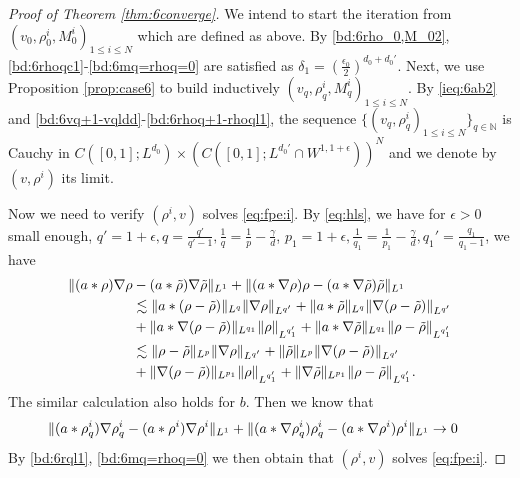 \documentclass[UTF-8,reqno]{amsart}
\numberwithin{equation}{section}
\theoremstyle{definition}
\def\leq{\leqslant}
\def\leq{\leqslant}
\def\N{\mathbb N} \def\kk{\zeta} \def\m{{\bf m}}
\begin{document}
\begin{proof}[Proof of Theorem \ref{thm:6converge}]
We intend to start the iteration from 
$(v_0, \rho^{i}_0,  M^{i}_0)_{1\leq i\leq N}$ which are defined as above. 
By \eqref{bd:6rho_0,M_02},  \eqref{bd:6rhoqc1}-\eqref{bd:6mq=rhoq=0} are satisfied as $\delta_1=(\frac{\epsilon_0}{2})^{d_0+d_0'}$.
Next, we use Proposition \ref{prop:case6} to build inductively $(v_q,\rho^{i}_q, M^{i}_q)_{1\leq i\leq N}$. By \eqref{ieq:6ab2} and \eqref{bd:6vq+1-vqldd}-\eqref{bd:6rhoq+1-rhoql1}, the sequence $\{(v_q,\rho^{i}_q)_{1\leq i\leq N}\}_{q\in \N}$ is
Cauchy in $C([0,1];L^{d_0})  \times (C([0,1];L^{d_0'}\cap W^{1,1+\epsilon}))^{N}$ 
     and we denote by $(v,\rho^{i})$ its limit.

     Now we need to verify $(\rho^{i},v)$  solves   \eqref{eq:fpe:i}.   By \eqref{eq:hls}, we have for  $\epsilon>0$ small enough, $q'=1+\epsilon,q=\frac{q'}{q'-1},\frac1q=\frac1p-\frac\gamma d$, $p_1=1+\epsilon,\frac1{q_1}=\frac1{p_1}-\frac\gamma d,q_1'=\frac{q_1}{q_1-1}$, we have
\begin{align}
     \|(a*\rho)\nabla\rho&-(a*\tilde{\rho})\nabla\tilde{\rho}\|_{L^1}+\|(a*\nabla \rho )\rho -(a*\nabla\tilde{\rho})\tilde{\rho}\|_{L^1}\notag\\
     &\lesssim \|a*(\rho-\tilde{\rho})\|_{L^q}\|\nabla\rho\|_{L^{q'}}+\| a*\tilde{\rho}\|_{L^q}\|\nabla(\rho-\tilde{\rho})\|_{L^{q'}}\notag\\
     &+\|  a*\nabla(\rho-\tilde\rho)\|_{L^{q_1}}\|\rho\|_{L^{q_1'}}+\| a*\nabla\tilde\rho\|_{L^{q_1}}\|\rho-\tilde{\rho}\|_{L^{q_1'}}\notag\\
     &\lesssim \| \rho-\tilde{\rho}\|_{L^p}\|\nabla\rho\|_{L^{q'}}+\| \tilde{\rho}\|_{L^p}\|\nabla(\rho-\tilde{\rho})\|_{L^{q'}}\notag\\
     &+\|  \nabla(\rho-\tilde\rho)\|_{L^{p_1}}\|\rho\|_{L^{q_1'}}+\|  \nabla\tilde\rho\|_{L^{p_1}}\|\rho-\tilde{\rho}\|_{L^{q_1'}}.\label{bd:6arhorho-}
\end{align}
The similar calculation also holds for $b$. Then we know that 
\begin{align}
     \|(a*\rho^i_q)\nabla\rho^i_q&-(a* {\rho^i})\nabla {\rho^i}\|_{L^1}+\|(a*\nabla \rho_q^i )\rho^i_q -(a*\nabla {\rho^i}) {\rho^i}\|_{L^1}\to0\notag
\end{align}
By \eqref{bd:6rql1}, \eqref{bd:6mq=rhoq=0}  we then obtain that $(\rho^{i},v)$  solves   \eqref{eq:fpe:i}. 
    


\end{proof}
\end{document}
